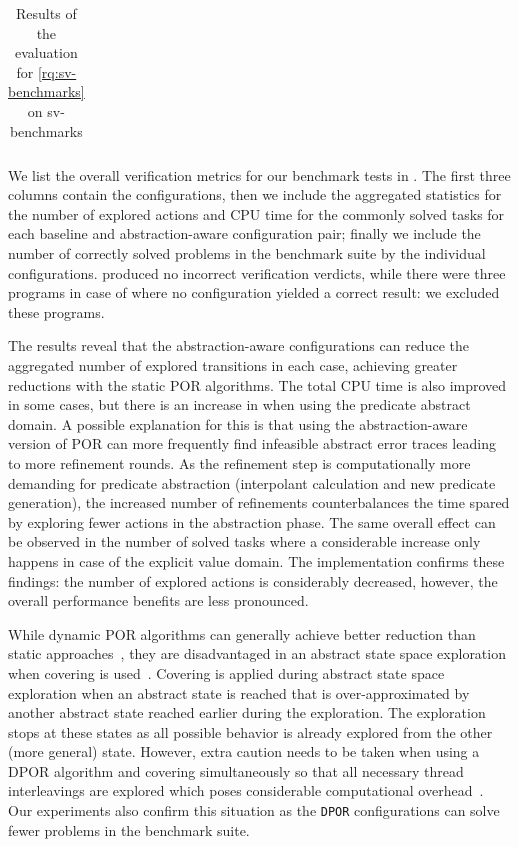 \documentclass[numbook]{svjour3}
\begin{document}
\begin{description}
\begin{table}[t]
\begin{tabular}{@{}rrrrlrlrl@{}}
    		\bottomrule
    	\end{tabular}
    	\medskip
    	\caption{Results of the evaluation for \ref{rq:sv-benchmarks} on sv-benchmarks}
    	\label{table:sv-benchmarks-results}
    \end{table}

    We list the overall verification metrics for our benchmark tests in . The first three columns contain the configurations, then we include the aggregated statistics for the number of explored actions and CPU time for the commonly solved tasks for each baseline and abstraction-aware configuration pair; finally we include the number of correctly solved problems in the benchmark suite by the individual configurations. \Th{} produced no incorrect verification verdicts, while there were three programs in case of \CPA{} where no configuration yielded a correct result: we excluded these programs.
    
    The results reveal that the abstraction-aware configurations can reduce the aggregated number of explored transitions in each case, achieving greater reductions with the static POR algorithms. The total CPU time is also improved in some cases, but there is an increase in \Th{} when using the predicate abstract domain. A possible explanation for this is that using the abstraction-aware version of POR can more frequently find infeasible abstract error traces leading to more refinement rounds. As the refinement step is computationally more demanding for predicate abstraction (interpolant calculation and new predicate generation), the increased number of refinements counterbalances the time spared by exploring fewer actions in the abstraction phase. The same overall effect can be observed in the number of solved tasks where a considerable increase only happens in case of the explicit value domain. The \CPA{} implementation confirms these findings: the number of explored actions is considerably decreased, however, the overall performance benefits are less pronounced.

    While dynamic POR algorithms can generally achieve better reduction than static approaches~\cite{dpor}, they are disadvantaged in an abstract state space exploration when covering is used~\cite{abpress}. Covering is applied during abstract state space exploration when an abstract state is reached that is over-approximated by another abstract state reached earlier during the exploration. The exploration stops at these states as all possible behavior is already explored from the other (more general) state. However, extra caution needs to be taken when using a DPOR algorithm and covering simultaneously so that all necessary thread interleavings are explored which poses considerable computational overhead~\cite{abpress}. Our experiments also confirm this situation as the \texttt{DPOR} configurations can solve fewer problems in the benchmark suite.
    

\end{description}
\end{document}
